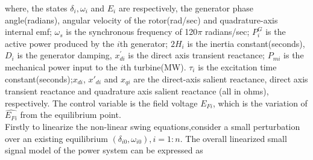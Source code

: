 \documentclass[a4paper]{article}
\begin{document}
where, the states $\delta_{i},\omega_{i}$ and $E_{i}$ are respectively, the generator phase angle(radians), angular velocity of the rotor(rad/sec) and quadrature-axis internal emf; $\omega_{s}$ is the synchronous frequency of 120$\pi$ radians/sec; $P_{i}^{G}$ is the active power produced by the $i$th generator; $2H_{i}$ is the inertia constant(seconds), $D_{i}$ is the generator damping, ${x}_{di}^{'}$ is the direct axis transient reactance; $P_{mi}$ is the mechanical power input to the $i$th turbine(MW). $\tau_{i}$ is the excitation time constant(seconds);$x_{di}$, $x'_{di}$ and $x_{qi}$ are the direct-axis salient reactance, direct axis transient reactance and quadrature axis salient reactance (all in ohms), respectively. The control variable is the field voltage $E_{Fi}$, which is the variation of $\hat{E_{Fi}}$ from the equilibrium point.\\
Firstly to linearize the non-linear swing equations,consider a small perturbation over an existing equilibrium $(\delta_{i0},\omega_{i0}),i = 1:n$. The overall linearized small signal model of the power system can be expressed as
\end{document}
